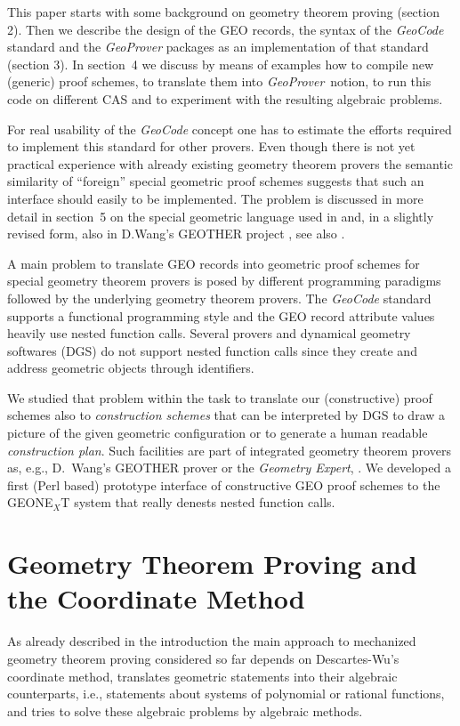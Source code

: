 \documentclass[11pt]{article}
\newcommand{\GC}{\textit{Geo\-Code}}
\newcommand{\GP}{\textit{Geo\-Prover}}
\begin{document}
This paper starts with some background on geometry theorem proving (section
2). Then we describe the design of the GEO records, the syntax of the {\GC}
standard and the {\GP} packages as an implementation of that standard (section
3). In section~4 we discuss by means of examples how to compile new (generic)
proof schemes, to translate them into \GP\ notion, to run this code on
different CAS and to experiment with the resulting algebraic problems.

For real usability of the {\GC} concept one has to estimate the efforts
required to implement this standard for other provers.  Even though there is
not yet practical experience with already existing geometry theorem provers
the semantic similarity of ``foreign'' special geometric proof schemes
suggests that such an interface should easily to be implemented.  The problem
is discussed in more detail in section~5 on the special geometric language
used in \cite{Wang_97a} and, in a slightly revised form, also in D.Wang's
GEOTHER project \cite{Geother}, see also \cite{Wang_96b}.
\medskip

A main problem to translate GEO records into geometric proof schemes for
special geometry theorem provers is posed by different programming paradigms
followed by the underlying geometry theorem provers. The {\GC} standard
supports a functional programming style and the GEO record attribute values
heavily use nested function calls. Several provers and dynamical geometry
softwares (DGS) do not support nested function calls since they create and
address geometric objects through identifiers.

We studied that problem within the task to translate our (constructive) proof
schemes also to {\em construction schemes} that can be interpreted by DGS to
draw a picture of the given geometric configuration or to generate a human
readable {\em construction plan}. Such facilities are part of integrated
geometry theorem provers as, e.g., D.~Wang's GEOTHER prover \cite{Geother,
  Wang_96b} or the {\em Geometry Expert}, \cite{gex}. We developed a first
(Perl based) prototype interface of constructive GEO proof schemes to the
{GEONE$_X$T} system \cite{Geonext} that really denests nested function calls.

\section{Geometry Theorem Proving and the Coordinate Method}

As already described in the introduction the main approach to mechanized
geometry theorem proving considered so far depends on Descartes-Wu's
coordinate method, translates geometric statements into their algebraic
counterparts, i.e., statements about systems of polynomial or rational
functions, and tries to solve these algebraic problems by algebraic methods.
\end{document}
